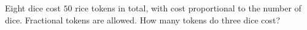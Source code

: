 Eight dice cost $50$ rice tokens in total, with cost proportional to the number of dice. Fractional tokens are allowed. How many tokens do three dice cost?
